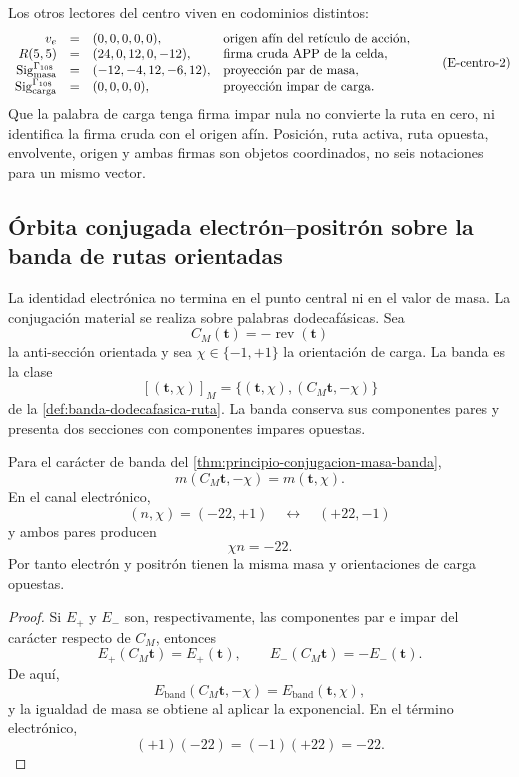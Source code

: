 Los otros lectores del centro viven en codominios distintos:
\[
\begin{array}{rcll}
 v_e&=&(0,0,0,0,0),
   &\text{origen afín del retículo de acción},\\
 R(5,5)&=&(24,0,12,0,-12),
   &\text{firma cruda APP de la celda},\\
 \operatorname{Sig}^{\Gamma_{108}}_{\rm masa}
   &=&(-12,-4,12,-6,12),
   &\text{proyección par de masa},\\
 \operatorname{Sig}^{\Gamma_{108}}_{\rm carga}
   &=&(0,0,0,0),
   &\text{proyección impar de carga}.
\end{array}
\tag{E-centro-2}\label{p12-83-c15-s2:eq:electron-firmas-tipadas-rev8}
\]
Que la palabra de carga tenga firma impar nula no convierte la ruta en
cero, ni identifica la firma cruda con el origen afín. Posición, ruta
activa, ruta opuesta, envolvente, origen y ambas firmas son objetos
coordinados, no seis notaciones para un mismo vector.

\subsection{Órbita conjugada electrón–positrón sobre la banda de rutas orientadas}

La identidad electrónica no termina en el punto central ni en el valor de
masa. La conjugación material se realiza sobre palabras dodecafásicas. Sea
\[
 C_M(\mathbf t)=-\operatorname{rev}(\mathbf t)
\]
la anti-sección orientada y sea
\(\chi\in\{-1,+1\}\) la orientación de carga. La banda es la clase
\[
 [(\mathbf t,\chi)]_M
 =
 \{(\mathbf t,\chi),(C_M\mathbf t,-\chi)\}
\]
de la \cref{def:banda-dodecafasica-ruta}. La banda conserva sus componentes
pares y presenta dos secciones con componentes impares opuestas.

\begin{theorem}
\label{p12-83-c15-s2:thm:electron-positron-biografia-rev6}
Para el carácter de banda del
\cref{thm:principio-conjugacion-masa-banda},
\[
 m(C_M\mathbf t,-\chi)=m(\mathbf t,\chi).
\]
En el canal electrónico,
\[
 (n,\chi)=(-22,+1)
 \quad\longleftrightarrow\quad
 (+22,-1)
\]
y ambos pares producen
\[
 \chi n=-22.
\]
Por tanto electrón y positrón tienen la misma masa y orientaciones de
carga opuestas.
\end{theorem}

\begin{proof}
Si \(E_+\) y \(E_-\) son, respectivamente, las componentes par e impar del
carácter respecto de \(C_M\), entonces
\[
 E_+(C_M\mathbf t)=E_+(\mathbf t),
 \qquad
 E_-(C_M\mathbf t)=-E_-(\mathbf t).
\]
De aquí,
\[
 E_{\mathrm{band}}(C_M\mathbf t,-\chi)
 =
 E_{\mathrm{band}}(\mathbf t,\chi),
\]
y la igualdad de masa se obtiene al aplicar la exponencial. En el término
electrónico,
\[
 (+1)(-22)=(-1)(+22)=-22.
\]
\end{proof}

